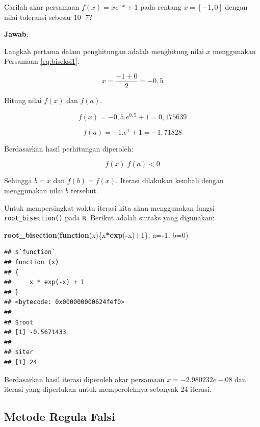 \documentclass[]{book}
\newenvironment{Shaded}{\begin{snugshade}}{\end{snugshade}}
\newcommand{\ControlFlowTok}[1]{\textcolor[rgb]{0.13,0.29,0.53}{\textbf{#1}}}
\newcommand{\DataTypeTok}[1]{\textcolor[rgb]{0.13,0.29,0.53}{#1}}
\newcommand{\DecValTok}[1]{\textcolor[rgb]{0.00,0.00,0.81}{#1}}
\newcommand{\KeywordTok}[1]{\textcolor[rgb]{0.13,0.29,0.53}{\textbf{#1}}}
\newcommand{\NormalTok}[1]{#1}
\newcommand{\OperatorTok}[1]{\textcolor[rgb]{0.81,0.36,0.00}{\textbf{#1}}}
\theoremstyle{definition}
\theoremstyle{definition}
\theoremstyle{definition}
\theoremstyle{remark}
\let\BeginKnitrBlock\begin \let\EndKnitrBlock\end
\begin{document}
\BeginKnitrBlock{example}
\protect\hypertarget{exm:biseksexmp}{}{\label{exm:biseksexmp} }Carilah akar persamaan \(f\left(x \right)=xe^{-x}+1\) pada rentang \(x=\left[-1,0 \right]\) dengan nilai toleransi sebesar \(10^-7\)?
\EndKnitrBlock{example}

\textbf{Jawab}:

Langkah pertama dalam penghitungan adalah menghitung nilai \(x\) menggunakan Persamaan \eqref{eq:biseksi1}.

\[
x=\frac{-1+0}{2}=-0,5
\]

Hitung nilai \(f\left(x \right)\) dan \(f\left(a \right)\).

\[
f\left(x \right)=-0,5.e^{0,5}+1=0,175639
\]

\[
f\left(a \right)=-1.e^{1}+1=-1,71828
\]

Berdasarkan hasil perhitungan diperoleh:

\[
f\left(x \right).f\left(a \right)<0
\]

Sehingga \(b=x\) dan \(f\left(b \right)=f\left(x \right)\). Iterasi dilakukan kembali dengan menggunakan nilai \(b\) tersebut.

Untuk mempersingkat waktu iterasi kita akan menggunakan fungsi \texttt{root\_bisection()} pada \texttt{R}. Berikut adalah sintaks yang digunakan:

\begin{Shaded}
\begin{Highlighting}[]
\KeywordTok{root_bisection}\NormalTok{(}\ControlFlowTok{function}\NormalTok{(x)\{x}\OperatorTok{*}\KeywordTok{exp}\NormalTok{(}\OperatorTok{-}\NormalTok{x)}\OperatorTok{+}\DecValTok{1}\NormalTok{\},}
               \DataTypeTok{a=}\OperatorTok{-}\DecValTok{1}\NormalTok{, }\DataTypeTok{b=}\DecValTok{0}\NormalTok{)}
\end{Highlighting}
\end{Shaded}

\begin{verbatim}
## $`function`
## function (x) 
## {
##     x * exp(-x) + 1
## }
## <bytecode: 0x000000000624fef0>
## 
## $root
## [1] -0.5671433
## 
## $iter
## [1] 24
\end{verbatim}

Berdasarkan hasil iterasi diperoleh akar persamaan \(x=-2.980232e-08\) dan iterasi yang diperlukan untuk memperolehnya sebanyak \(24\) iterasi.

\hypertarget{regulafalsi}{%
\subsection{Metode Regula Falsi}\label{regulafalsi}}
\end{document}
